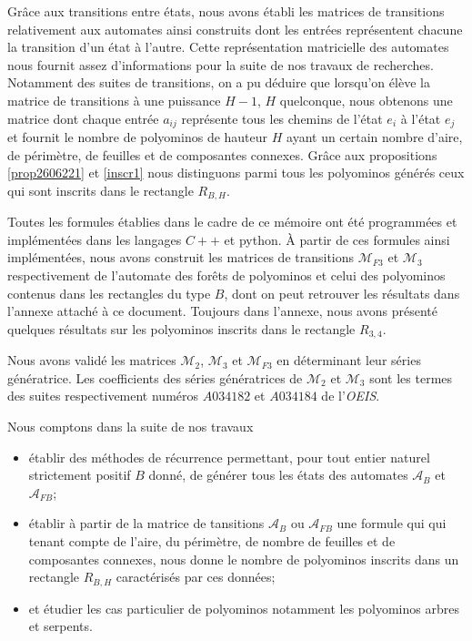     Grâce aux transitions entre états, nous avons établi les matrices de transitions relativement aux automates ainsi construits dont les entrées représentent chacune la transition d'un état à l'autre. Cette représentation matricielle des automates nous fournit assez d'informations pour la suite de nos travaux de recherches. Notamment des suites de transitions, on a pu déduire que lorsqu'on élève la matrice de transitions à une puissance $H-1$, $H$ quelconque, nous obtenons une matrice dont chaque entrée $a_{ij}$ représente tous les chemins de l'état $e_{i}$ à l'état $e_{j}$ et fournit le nombre de polyominos de hauteur $H$ ayant un certain nombre d'aire, de périmètre, de feuilles et de composantes connexes. Grâce aux propositions \ref{prop2606221} et \ref{inscr1} nous distinguons parmi tous les polyominos générés ceux qui sont inscrits dans le rectangle $R_{B,H}$.
    
     Toutes les formules établies dans le cadre de ce mémoire ont été programmées et implémentées dans les langages $C++$ et python. À partir de ces formules ainsi implémentées, nous avons construit les matrices de transitions $\mathcal{M}_{F3}$  et $\mathcal{M}_{3}$ respectivement de l'automate des forêts de polyominos et celui des polyominos contenus dans les rectangles du type $B$, dont on peut retrouver les résultats dans l'annexe attaché à ce document. Toujours dans l'annexe, nous avons présenté quelques résultats sur les polyominos inscrits dans le rectangle $R_{3,4}$.
     
     Nous avons validé les matrices $\mathcal{M}_{2}$, $\mathcal{M}_{3}$ et $\mathcal{M}_{F3}$ en déterminant leur séries génératrice. Les coefficients des séries génératrices de $\mathcal{M}_{2}$ et $\mathcal{M}_{3}$  sont  les termes des suites  respectivement numéros $A034182$ et $A034184$ de l'\emph{OEIS}.
     
     
     Nous comptons dans la suite de nos travaux 
     \begin{itemize}
     \item établir des méthodes de récurrence permettant, pour tout entier naturel strictement positif $B$ donné,  de générer tous les états des automates $\mathcal{A}_{B}$ et $\mathcal{A}_{FB}$;
     \item établir à partir de la matrice de tansitions $\mathcal{A}_{B}$ ou $\mathcal{A}_{FB}$  une formule qui qui tenant compte de l'aire, du périmètre, de nombre de feuilles et de composantes connexes, nous donne le nombre de polyominos inscrits  dans un rectangle $R_{B,H}$ caractérisés par ces données;
     \item et étudier les cas particulier de polyominos notamment les polyominos arbres et serpents. 
     \end{itemize}
   
  